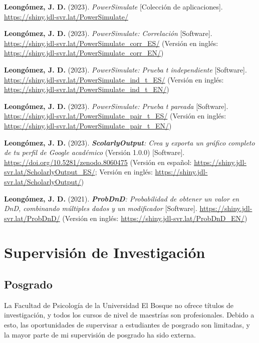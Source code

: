 \documentclass[11pt,a4paper,]{awesome-cv}
\begin{document}
\textbf{Leongómez, J. D.} (2023). \emph{PowerSimulate} {[}Colección de
aplicaciones{]}. \url{https://shiny.jdl-svr.lat/PowerSimulate/}

\textbf{Leongómez, J. D.} (2023). \emph{PowerSimulate: Correlación}
{[}Software{]}. \url{https://shiny.jdl-svr.lat/PowerSimulate_corr_ES/}
(Versión en inglés:
\url{https://shiny.jdl-svr.lat/PowerSimulate_corr_EN/})

\textbf{Leongómez, J. D.} (2023). \emph{PowerSimulate: Prueba t
independiente} {[}Software{]}.
\url{https://shiny.jdl-svr.lat/PowerSimulate_ind_t_ES/} (Versión en
inglés: \url{https://shiny.jdl-svr.lat/PowerSimulate_ind_t_EN/})

\textbf{Leongómez, J. D.} (2023). \emph{PowerSimulate: Prueba t pareada}
{[}Software{]}. \url{https://shiny.jdl-svr.lat/PowerSimulate_pair_t_ES/}
(Versión en inglés:
\url{https://shiny.jdl-svr.lat/PowerSimulate_pair_t_EN/})

\textbf{Leongómez, J. D.} (2023). \emph{\textbf{ScolarlyOutput}: Crea y
exporta un gráfico completo de tu perfil de Google académico} (Versión
1.0.0) {[}Software{]}.
\href{https://shiny.jdl-svr.lat/ScholarlyOutput/}{https://doi.org/10.5281/zenodo.8060475}
(Versión en español:
\url{https://shiny.jdl-svr.lat/ScholarlyOutput_ES/}; Versión en inglés:
\url{https://shiny.jdl-svr.lat/ScholarlyOutput/})

\textbf{Leongómez, J. D.} (2021). \emph{\textbf{ProbDnD}: Probabilidad
de obtener un valor en DnD, combinando múltiples dados y un modificador}
{[}Software{]}. \url{https://shiny.jdl-svr.lat/ProbDnD/} (Versión en
inglés: \url{https://shiny.jdl-svr.lat/ProbDnD_EN/})

\endgroup

\hypertarget{supervisiuxf3n-de-investigaciuxf3n}{%
\section{Supervisión de
Investigación}\label{supervisiuxf3n-de-investigaciuxf3n}}

\hypertarget{section}{%
\subsection{\texorpdfstring{\textbf{Posgrado}}{}}\label{section}}

\begin{footnotesize}
La Facultad de Psicología de la Universidad El Bosque no ofrece títulos de investigación, y todos los cursos de nivel de maestrías son profesionales. Debido a esto, las oportunidades de supervisar a estudiantes de posgrado son limitadas, y la mayor parte de mi supervisión de posgrado ha sido externa.
\end{footnotesize}
\end{document}

